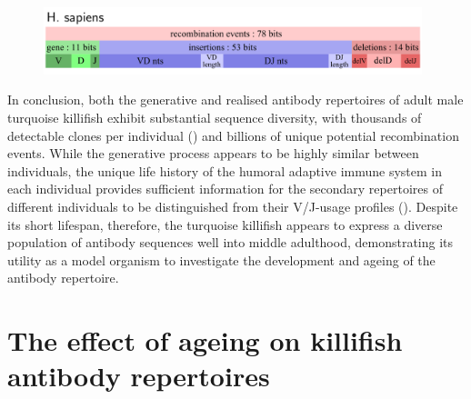 \begin{figure}
\centering
\includegraphics[width = 0.98\textwidth]{_Figures/png_edited/human-repertoire-entropy.png}
\label{fig:igseq-pilot-human-entropies}
\end{figure}

In conclusion, both the generative and realised antibody repertoires of adult male turquoise killifish exhibit substantial sequence diversity, with thousands of detectable clones per individual () and billions of unique potential recombination events. While the generative process appears to be highly similar between individuals, the unique life history of the humoral adaptive immune system in each individual provides sufficient information for the secondary repertoires of different individuals to be distinguished from their V/J-usage profiles (). Despite its short lifespan, therefore, the turquoise killifish appears to express a diverse population of antibody sequences well into middle adulthood, demonstrating its utility as a model organism to investigate the development and ageing of the antibody repertoire.

\FloatBarrier
\clearpage

\section{The effect of ageing on killifish antibody repertoires}
\label{sec:igseq_ageing}

